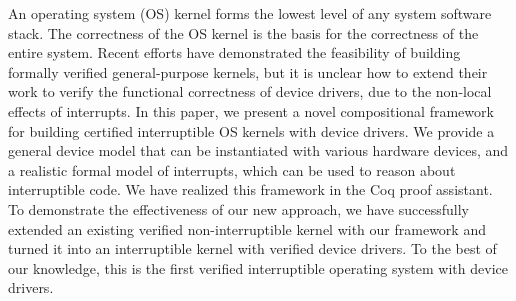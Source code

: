 An operating system (OS) kernel forms the lowest level of any system
software stack. The correctness of the OS kernel is the basis for the
correctness of the entire system. Recent efforts have demonstrated the
feasibility of building formally verified general-purpose kernels, but
it is unclear how to extend their work to verify the functional
correctness of device drivers, due to the non-local effects of
interrupts. In this paper, we present a novel compositional framework
for building certified interruptible OS kernels with device
drivers. We provide a general device model that can be instantiated
with various hardware devices, and a realistic formal model of
interrupts, which can be used to reason about interruptible code. We
have realized this framework in the Coq proof assistant. To
demonstrate the effectiveness of our new approach, we have
successfully extended an existing verified non-interruptible kernel
with our framework and turned it into an interruptible kernel with
verified device drivers. To the best of our knowledge, this is the
first verified interruptible operating system with device drivers.
